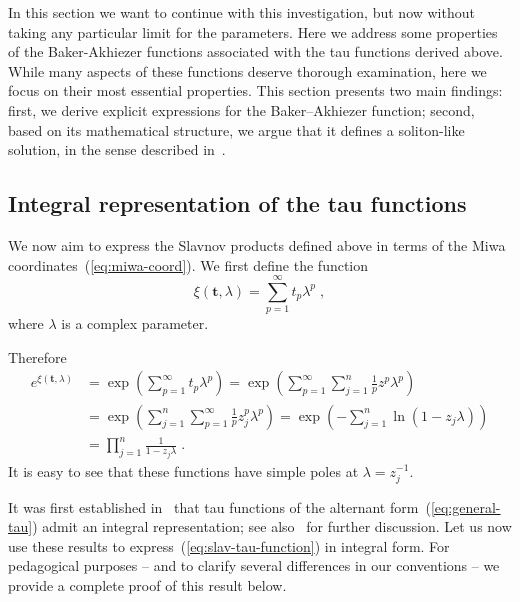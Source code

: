 \documentclass[a4paper,11pt]{amsart}
\begin{document}
In this section we want to continue with this investigation, but now
without taking any particular limit for the parameters. Here we
address some properties of the Baker-Akhiezer functions associated
with the tau functions derived above. While many aspects of these
functions deserve thorough examination, here we focus on their most
essential properties.  This section presents two main findings: first,
we derive explicit expressions for the Baker--Akhiezer function;
second, based on its mathematical structure, we argue that it defines
a soliton-like solution, in the sense described
in~\cite{Zabrodin2018}.

\subsection{Integral representation of the tau functions}

We now aim to express the Slavnov products defined above in terms of
the Miwa coordinates~(\ref{eq:miwa-coord}). We first define the
function
\begin{equation}
  \xi(\bm{t}, \lambda) = \sum_{p=1}^\infty t_p \lambda^p\; , 
\end{equation}
where \(\lambda\) is a complex parameter.

Therefore
\begin{equation}
  \begin{split}
    e^{\xi(\bm{t}, \lambda)} & = \exp\left( \sum_{p=1}^\infty t_p \lambda^p \right)
    = \exp\left( \sum_{p=1}^\infty \sum_{j=1}^n \frac{1}{p} z^p \lambda^p \right) \\
    & = \exp\left( \sum_{j=1}^n \sum_{p=1}^\infty  \frac{1}{p} z_j^p \lambda^p \right)
    = \exp\left( - \sum_{j=1}^n \ln( 1 -  z_j \lambda ) \right) \\
    & =  \prod_{j=1}^n \frac{1}{1 -  z_j \lambda} \; .
  \end{split}
\end{equation}
It is easy to see that these functions have simple poles at \( \lambda = z_j^{-1}\).

It was first established in~\cite{ZinnJustin:2002cr,
  ZinnJustin:2002pk} that tau functions of the alternant
form~(\ref{eq:general-tau}) admit an integral representation; see
also~\cite{Zinnjustin2009, Araujo:2021ghu} for further discussion. Let
us now use these results to express~(\ref{eq:slav-tau-function}) in
integral form. For pedagogical purposes -- and to clarify several
differences in our conventions -- we provide a complete proof of this
result below.
\end{document}
